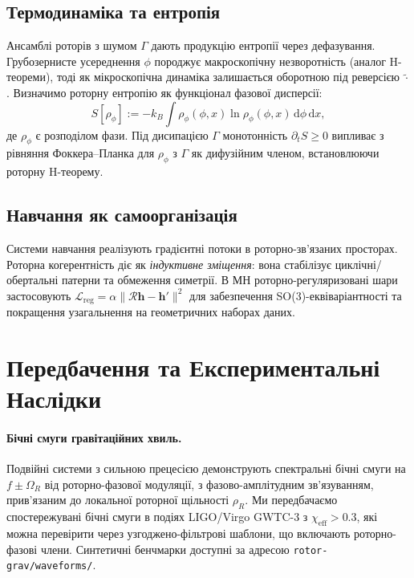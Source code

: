 \documentclass[11pt,a4paper]{article}
\newcommand{\rev}[1]{\widetilde{#1}}           %
\newcommand{\Rotor}{\mathcal{R}}
\theoremstyle{definition}
\theoremstyle{plain}
\theoremstyle{remark}
\begin{document}
\subsection{Термодинаміка та ентропія}
Ансамблі роторів з шумом $\Gamma$ дають продукцію ентропії через дефазування. Грубозернисте усереднення $\phi$ породжує макроскопічну незворотність (аналог H-теореми), тоді як мікроскопічна динаміка залишається оборотною під реверсією $\rev{\cdot}$. Визначимо роторну ентропію як функціонал фазової дисперсії:
\begin{equation}
  S[\rho_\phi] := -k_B \int \rho_\phi(\phi,x) \ln \rho_\phi(\phi,x)\, \mathrm{d}\phi\, \mathrm{d}x,
\end{equation}
де $\rho_\phi$ є розподілом фази. Під дисипацією $\Gamma$ монотонність $\partial_t S \geq 0$ випливає з рівняння Фоккера--Планка для $\rho_\phi$ з $\Gamma$ як дифузійним членом, встановлюючи роторну H-теорему.

\subsection{Навчання як самоорганізація}
Системи навчання реалізують градієнтні потоки в роторно-зв'язаних просторах. Роторна когерентність діє як \emph{індуктивне зміщення}: вона стабілізує циклічні/обертальні патерни та обмеження симетрії. В МН роторно-регуляризовані шари застосовують $\mathcal{L}_{\text{reg}} = \alpha \|\Rotor \mathbf{h} - \mathbf{h}'\|^2$ для забезпечення SO(3)-еквіваріантності та покращення узагальнення на геометричних наборах даних.

\vspace{1em}

\section{Передбачення та Експериментальні Наслідки}
\paragraph{Бічні смуги гравітаційних хвиль.}
Подвійні системи з сильною прецесією демонструють спектральні бічні смуги на $f\pm \Omega_R$ від роторно-фазової модуляції, з фазово-амплітудним зв'язуванням, прив'язаним до локальної роторної щільності $\rho_R$. Ми передбачаємо спостережувані бічні смуги в подіях LIGO/Virgo GWTC-3 з $\chi_\text{eff} > 0.3$, які можна перевірити через узгоджено-фільтрові шаблони, що включають роторно-фазові члени. Синтетичні бенчмарки доступні за адресою \texttt{rotor-grav/waveforms/}.
\end{document}
